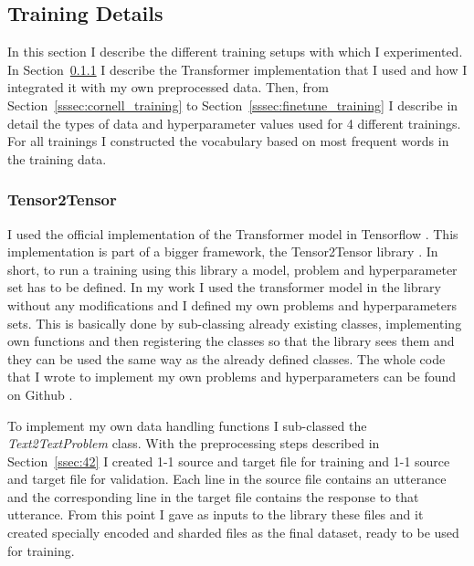 \documentclass[12pt]{article}
\begin{document}
\subsection{Training Details} \label{ssec:43}
In this section I describe the different training setups with which I experimented. In Section~\ref{sssec:t2t} I describe the Transformer implementation that I used and how I integrated it with my own preprocessed data. Then, from Section~\ref{sssec:cornell_training} to Section~\ref{sssec:finetune_training} I describe in detail the types of data and hyperparameter values used for 4 different trainings. For all trainings I constructed the vocabulary based on most frequent words in the training data.

\subsubsection{Tensor2Tensor} \label{sssec:t2t}
I used the official implementation of the Transformer model in Tensorflow \cite{Tensorflow}. This implementation is part of a bigger framework, the Tensor2Tensor library \cite{t2t}. In short, to run a training using this library a model, problem and hyperparameter set has to be defined. In my work I used the transformer model in the library without any modifications and I defined my own problems and hyperparameters sets. This is basically done by sub-classing already existing classes, implementing own functions and then registering the classes so that the library sees them and they can be used the same way as the already defined classes. The whole code that I wrote to implement my own problems and hyperparameters can be found on Github \cite{seq2seqchatbots}.

To implement my own data handling functions I sub-classed the \textit{Text2TextProblem} class. With the preprocessing steps described in Section~\ref{ssec:42} I created 1-1 source and target file for training and 1-1 source and target file for validation. Each line in the source file contains an utterance and the corresponding line in the target file contains the response to that utterance. From this point I gave as inputs to the library these files and it created specially encoded and sharded files as the final dataset, ready to be used for training.
\end{document}
